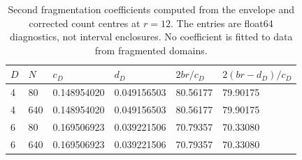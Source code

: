 \begin{table}[htbp]
\centering
\caption{Second fragmentation coefficients computed from the envelope and corrected count centres at $r=12$. The entries are float64 diagnostics, not interval enclosures. No coefficient is fitted to data from fragmented domains.}
\label{tab:second_order_coefficients}
\begin{tabular}{llllll}
\toprule
$D$ & $N$ & $c_D$ & $d_D$ & $2br/c_D$ & $2(br-d_D)/c_D$ \\
\midrule
4 & 80 & 0.148954020 & 0.049156503 & 80.56177 & 79.90175 \\
4 & 640 & 0.148954020 & 0.049156503 & 80.56177 & 79.90175 \\
6 & 80 & 0.169506923 & 0.039221506 & 70.79357 & 70.33080 \\
6 & 640 & 0.169506923 & 0.039221506 & 70.79357 & 70.33080 \\
\bottomrule
\end{tabular}
\end{table}
